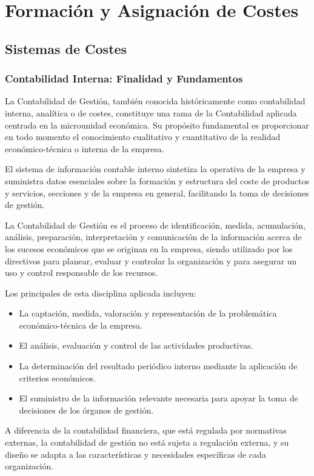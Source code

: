 \chapter{Formación y Asignación de Costes}

\section{Sistemas de Costes}

\subsection{Contabilidad Interna: Finalidad y Fundamentos}

La Contabilidad de Gestión, también conocida históricamente como contabilidad interna, analítica o de costes, constituye una rama de la Contabilidad aplicada centrada en la microunidad económica. Su propósito fundamental es proporcionar en todo momento el conocimiento cualitativo y cuantitativo de la realidad económico-técnica o interna de la empresa.

El sistema de información contable interno sintetiza la operativa de la empresa y suministra datos esenciales sobre la formación y estructura del coste de productos y servicios, secciones y de la empresa en general, facilitando la toma de decisiones de gestión.

\begin{definicion}
La Contabilidad de Gestión es el proceso de identificación, medida, acumulación, análisis, preparación, interpretación y comunicación de la información acerca de los sucesos económicos que se originan en la empresa, siendo utilizado por los directivos para planear, evaluar y controlar la organización y para asegurar un uso y control responsable de los recursos.
\end{definicion}

Los principales  de esta disciplina aplicada incluyen:
\begin{itemize}
    \item La captación, medida, valoración y representación de la problemática económico-técnica de la empresa.
    \item El análisis, evaluación y control de las actividades productivas.
    \item La determinación del resultado periódico interno mediante la aplicación de criterios económicos.
    \item El suministro de la información relevante necesaria para apoyar la toma de decisiones de los órganos de gestión.
\end{itemize}
A diferencia de la contabilidad financiera, que está regulada por normativas externas, la contabilidad de gestión no está sujeta a regulación externa, y su diseño se adapta a las características y necesidades específicas de cada organización.

